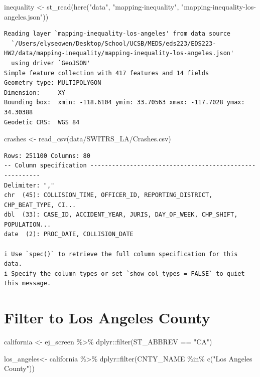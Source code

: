 \documentclass[
  letterpaper,
  DIV=11,
  numbers=noendperiod]{scrartcl}
\newenvironment{Shaded}{\begin{snugshade}}{\end{snugshade}}
\newcommand{\FunctionTok}[1]{\textcolor[rgb]{0.28,0.35,0.67}{#1}}
\newcommand{\NormalTok}[1]{\textcolor[rgb]{0.00,0.23,0.31}{#1}}
\newcommand{\OtherTok}[1]{\textcolor[rgb]{0.00,0.23,0.31}{#1}}
\newcommand{\SpecialCharTok}[1]{\textcolor[rgb]{0.37,0.37,0.37}{#1}}
\newcommand{\StringTok}[1]{\textcolor[rgb]{0.13,0.47,0.30}{#1}}
\begin{document}
\begin{Shaded}
\begin{Highlighting}[]
\NormalTok{inequality }\OtherTok{\textless{}{-}} \FunctionTok{st\_read}\NormalTok{(}\FunctionTok{here}\NormalTok{(}\StringTok{"data"}\NormalTok{, }\StringTok{"mapping{-}inequality"}\NormalTok{, }\StringTok{"mapping{-}inequality{-}los{-}angeles.json"}\NormalTok{))}
\end{Highlighting}
\end{Shaded}

\begin{verbatim}
Reading layer `mapping-inequality-los-angeles' from data source 
  `/Users/elyseowen/Desktop/School/UCSB/MEDS/eds223/EDS223-HW2/data/mapping-inequality/mapping-inequality-los-angeles.json' 
  using driver `GeoJSON'
Simple feature collection with 417 features and 14 fields
Geometry type: MULTIPOLYGON
Dimension:     XY
Bounding box:  xmin: -118.6104 ymin: 33.70563 xmax: -117.7028 ymax: 34.30388
Geodetic CRS:  WGS 84
\end{verbatim}

\begin{Shaded}
\begin{Highlighting}[]
\NormalTok{crashes }\OtherTok{\textless{}{-}} \FunctionTok{read\_csv}\NormalTok{(}\StringTok{\textquotesingle{}data/SWITRS\_LA/Crashes.csv\textquotesingle{}}\NormalTok{)}
\end{Highlighting}
\end{Shaded}

\begin{verbatim}
Rows: 251100 Columns: 80
-- Column specification --------------------------------------------------------
Delimiter: ","
chr  (45): COLLISION_TIME, OFFICER_ID, REPORTING_DISTRICT, CHP_BEAT_TYPE, CI...
dbl  (33): CASE_ID, ACCIDENT_YEAR, JURIS, DAY_OF_WEEK, CHP_SHIFT, POPULATION...
date  (2): PROC_DATE, COLLISION_DATE

i Use `spec()` to retrieve the full column specification for this data.
i Specify the column types or set `show_col_types = FALSE` to quiet this message.
\end{verbatim}

\section{Filter to Los Angeles
County}\label{filter-to-los-angeles-county}

\begin{Shaded}
\begin{Highlighting}[]
\NormalTok{california }\OtherTok{\textless{}{-}}\NormalTok{ ej\_screen }\SpecialCharTok{\%\textgreater{}\%}
\NormalTok{  dplyr}\SpecialCharTok{::}\FunctionTok{filter}\NormalTok{(ST\_ABBREV }\SpecialCharTok{==} \StringTok{"CA"}\NormalTok{)}

\NormalTok{los\_angeles}\OtherTok{\textless{}{-}}\NormalTok{ california }\SpecialCharTok{\%\textgreater{}\%}
\NormalTok{  dplyr}\SpecialCharTok{::}\FunctionTok{filter}\NormalTok{(CNTY\_NAME }\SpecialCharTok{\%in\%} \FunctionTok{c}\NormalTok{(}\StringTok{"Los Angeles County"}\NormalTok{))}
\end{Highlighting}
\end{Shaded}
\end{document}
